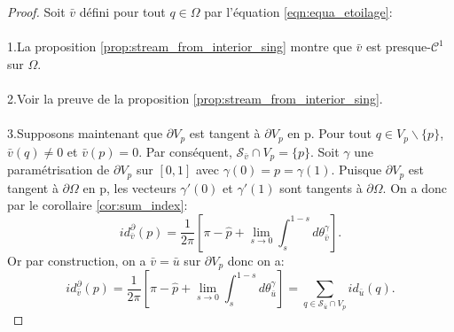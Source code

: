 \begin{proof}
Soit $\bar{v}$ défini pour tout $q\in\Omega$ par l'équation \eqref{eqn:equa_etoilage}:\\\\
1.\quad La proposition \ref{prop:stream_from_interior_sing} montre que $\bar{v}$ est presque-$\mathcal{C}^1$ sur $\Omega$.\\\\
2.\quad Voir la preuve de la proposition \ref{prop:stream_from_interior_sing}.\\\\
3.\quad Supposons maintenant que $\partial V_p$ est tangent à $\partial V_p$ en p. Pour tout $q\in V_p\backslash\{p\}$, $\bar{v}(q)\neq 0$ et $\bar{v}(p)=0$. Par conséquent, $\mathcal{S}_{\bar{v}}\cap V_p=\{p\}$. Soit $\gamma$ une paramétrisation de $\partial V_p$ sur $[0, 1]$ avec $\gamma(0)=p=\gamma(1)$. Puisque $\partial V_p$ est tangent à $\partial\Omega$ en p, les vecteurs $\gamma'(0)$ et $\gamma'(1)$ sont tangents à $\partial\Omega$. On a donc par le corollaire \ref{cor:sum_index}:
$$
id^\partial_{\bar{v}}(p)=\frac{1}{2\pi}\left[\pi-\hat{p}+\lim\limits_{s\rightarrow 0}\int_s^{1-s}d\theta_{\bar{v}}^\gamma\right].
$$
Or par construction, on a $\bar{v}=\bar{u}$ sur $\partial V_p$ donc on a:
$$id^\partial_{\bar{v}}(p)=\frac{1}{2\pi}\left[\pi-\hat{p}+\lim\limits_{s\rightarrow 0}\int_s^{1-s}d\theta_{\bar{u}}^\gamma\right]=\sum_{q\in\mathcal{S}_{\bar{u}}\cap V_p}id_{\bar{u}}(q).$$

\end{proof}

